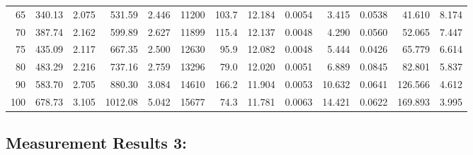 \documentclass[10pt]{article}
\begin{document}
{\begin{tabular}{|r|rr|rr|rr|rr|rr|r|r|}
       65 &       340.13 &        2.075 &       531.59 &        2.446 &        11200 &        103.7 &       12.184 &       0.0054 &        3.415 &       0.0538 &       41.610 &        8.174 \\
       70 &       387.74 &        2.162 &       599.89 &        2.627 &        11899 &        115.4 &       12.137 &       0.0048 &        4.290 &       0.0560 &       52.065 &        7.447 \\
       75 &       435.09 &        2.117 &       667.35 &        2.500 &        12630 &         95.9 &       12.082 &       0.0048 &        5.444 &       0.0426 &       65.779 &        6.614 \\
       80 &       483.29 &        2.216 &       737.16 &        2.759 &        13296 &         79.0 &       12.020 &       0.0051 &        6.889 &       0.0845 &       82.801 &        5.837 \\
       90 &       583.70 &        2.705 &       880.30 &        3.084 &        14610 &        166.2 &       11.904 &       0.0053 &       10.632 &       0.0641 &      126.566 &        4.612 \\
      100 &       678.73 &        3.105 &      1012.08 &        5.042 &        15677 &         74.3 &       11.781 &       0.0063 &       14.421 &       0.0622 &      169.893 &        3.995 \\
\hline
\end{tabular}
}



\subsection*{\large \bf Measurement Results 3:}
\end{document}

